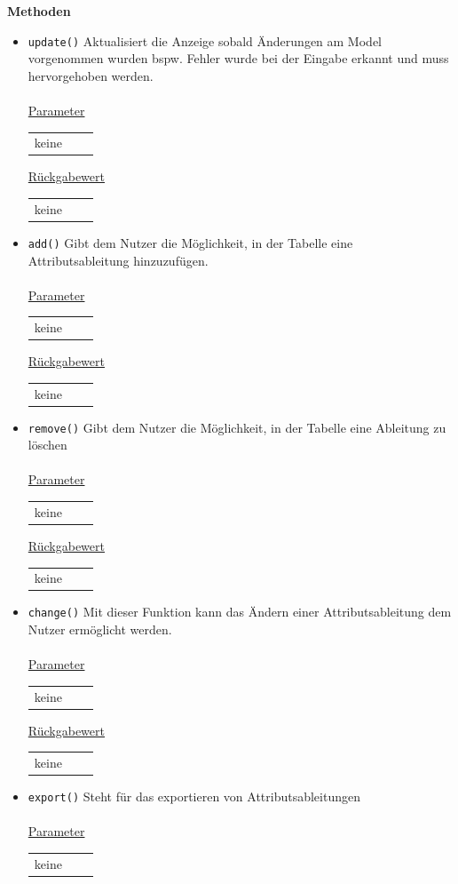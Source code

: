 \documentclass{article}
\begin{document}
\textbf{{Methoden}}
\begin{itemize}
\item \texttt{update()} \newline Aktualisiert die Anzeige sobald Änderungen am Model vorgenommen wurden bspw. Fehler wurde bei der Eingabe erkannt und muss hervorgehoben werden.
\\\\
\underline{{Parameter}} 
\begin{tabular}{lll}
 keine
\end{tabular}

\underline{{Rückgabewert}}
\begin{tabular}{lll}
keine
\end{tabular}
\item \texttt{add()} \newline Gibt dem Nutzer die Möglichkeit, in der Tabelle eine Attributsableitung hinzuzufügen.
\\\\
\underline{{Parameter}} 
\begin{tabular}{lll}
keine
\end{tabular}

\underline{{Rückgabewert}}
\begin{tabular}{lll}
keine
\end{tabular}
\item \texttt{remove()} \newline Gibt dem Nutzer die Möglichkeit, in der Tabelle eine Ableitung zu löschen
\\\\
\underline{{Parameter}} 
\begin{tabular}{lll}
keine
\end{tabular}

\underline{{Rückgabewert}}
\begin{tabular}{lll}
 keine
\end{tabular}
\item \texttt{change()} \newline Mit dieser Funktion kann das Ändern einer Attributsableitung dem Nutzer ermöglicht werden.
\\\\
\underline{{Parameter}} 
\begin{tabular}{lll}
keine 
\end{tabular}

\underline{{Rückgabewert}}
\begin{tabular}{lll}
keine
\end{tabular}
\item \texttt{export()} \newline Steht für das exportieren von Attributsableitungen
\\\\
\underline{{Parameter}} 
\begin{tabular}{lll}
keine 
\end{tabular}


\end{itemize}
\end{document}
